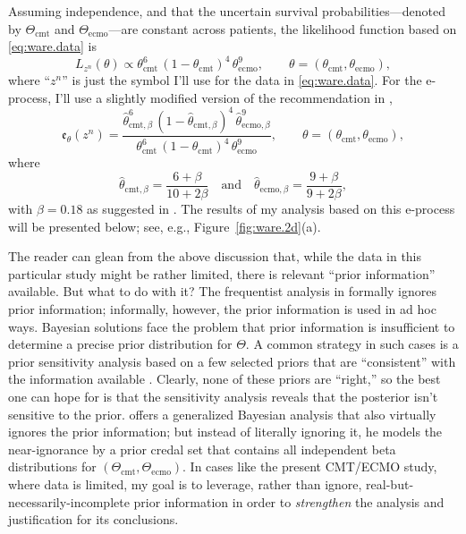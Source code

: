 \documentclass[a4paper, 12pt]{article}
\theoremstyle{plain}
\theoremstyle{definition}
\theoremstyle{remark}
\newcommand{\eval}{\mathfrak{e}}
\begin{document}
Assuming independence, and that the uncertain survival probabilities---denoted by $\Theta_\text{cmt}$ and $\Theta_\text{ecmo}$---are constant across patients, the likelihood function based on \eqref{eq:ware.data} is 
\[ L_{z^n}(\theta) \propto \theta_\text{cmt}^6 \, (1 - \theta_\text{cmt})^4 \, \theta_\text{ecmo}^9, \qquad \theta=(\theta_\text{cmt}, \theta_\text{ecmo}), \]
where ``$z^n$'' is just the symbol I'll use for the data in \eqref{eq:ware.data}.  For the e-process, I'll use a slightly modified version of the recommendation in \citet{turner.grunwald.2023},
\[ \eval_\theta(z^n) = \frac{\hat\theta_{\text{cmt},\beta}^6 \, (1 - \hat\theta_{\text{cmt},\beta})^4 \, \hat\theta_{\text{ecmo},\beta}^9}{\theta_\text{cmt}^6 \, (1 - \theta_\text{cmt})^4 \, \theta_\text{ecmo}^9}, \qquad \theta = (\theta_\text{cmt}, \theta_\text{ecmo}), \]
where 
\[ \hat\theta_{\text{cmt},\beta} = \frac{6 + \beta}{10 + 2\beta} \quad \text{and} \quad \hat\theta_{\text{ecmo},\beta} = \frac{9 + \beta}{9 + 2\beta}, \]
with $\beta=0.18$ as suggested in \citet[][Sec.~3]{turner.grunwald.2023}. The results of my analysis based on this e-process will be presented below; see, e.g., Figure~\ref{fig:ware.2d}(a). 

The reader can glean from the above discussion that, while the data in this particular study might be rather limited, there is relevant ``prior information'' available.  But what to do with it?  The frequentist analysis in \citet{ware1989} formally ignores prior information; informally, however, the prior information is used in ad hoc ways.  Bayesian solutions face the problem that prior information is insufficient to determine a precise prior distribution for $\Theta$.  A common strategy in such cases is a prior sensitivity analysis based on a few selected priors that are ``consistent'' with the information available \citep{kass.greenhouse.1989, kass1992}.  Clearly, none of these priors are ``right,'' so the best one can hope for is that the sensitivity analysis reveals that the posterior isn't sensitive to the prior.  
\citet[][Sec.~5]{walley1996} offers a generalized Bayesian analysis that also virtually ignores the prior information; but instead of literally ignoring it, he models the near-ignorance by a prior credal set that contains all independent beta distributions for $(\Theta_\text{cmt}, \Theta_\text{ecmo})$.  In cases like the present CMT/ECMO study, where data is limited, my goal is to leverage, rather than ignore, real-but-necessarily-incomplete prior information in order to {\em strengthen} the analysis and justification for its conclusions.  
\end{document}
